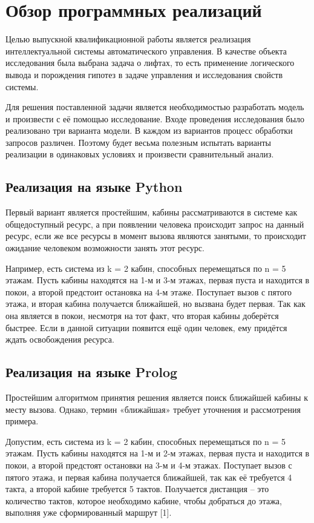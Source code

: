 \section{ Обзор программных реализаций}

	Целью выпускной квалификационной работы является реализация интеллектуальной системы автоматического управления.
		В качестве объекта исследования была выбрана задача о лифтах, то есть применение логического вывода и
		порождения гипотез в задаче управления и исследования свойств системы.

	Для решения поставленной задачи является необходимостью разработать модель и произвести с её
		помощью исследование. Входе проведения исследования было реализовано три варианта модели.
		В каждом из вариантов процесс обработки запросов различен. Поэтому будет весьма полезным испытать
		варианты реализации в одинаковых условиях и произвести сравнительный анализ.

\subsection{Реализация на языке Python}
	Первый вариант является простейшим, кабины рассматриваются в системе как общедоступный ресурс,
		а при появлении человека происходит запрос на данный ресурс, если же все ресурсы в момент вызова
		являются занятыми, то происходит ожидание человеком возможности занять этот ресурс.

	Например, есть система из k = 2 кабин, способных перемещаться по n =
		5 этажам. Пусть кабины находятся на 1-м и 3-м этажах, первая пуста и находится
		в покои, а второй предстоит остановка на 4-м этаже. Поступает
		вызов с пятого этажа, и вторая кабина получается ближайшей, но вызвана будет первая.
		Так как она является в покои, несмотря на тот факт, что вторая кабины доберётся быстрее.
		Если в данной ситуации появится ещё один человек, ему придётся ждать освобождения ресурса.

\subsection{Реализация на языке Prolog}
	Простейшим алгоритмом принятия решения является поиск ближайшей
		кабины к месту вызова. Однако, термин «ближайшая» требует уточнения и рассмотрения примера.

	Допустим, есть система из k = 2 кабин, способных перемещаться по n =
		5 этажам. Пусть кабины находятся на 1-м и 2-м этажах, первая пуста и находится
		в покои, а второй предстоят остановки на 3-м и 4-м этажах. Поступает
		вызов с пятого этажа, и первая кабина получается ближайшей, так как её требуется
		4 такта, а второй кабине требуется 5 тактов. Получается дистанция –
		это количество тактов, которое необходимо кабине, чтобы добраться до этажа,
		выполняя уже сформированный маршрут [1].
